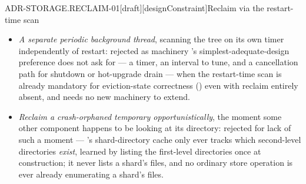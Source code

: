 \begin{requirement}{ADR-STORAGE.RECLAIM-01}[draft][designConstraint]{Reclaim via the restart-time scan}
\begin{itemize}
{      \texttt{purge}}: when a variant is stored, append its hash to a small
      list kept beside its primary, so that purging the primary can unlink
      the listed variants at once. Rejected: a new on-disk structure per
      varied primary, which must stay consistent while variants of one
      primary are stored and replaced concurrently, across processes, and
      through crashes --- and the restart-time scan must exist anyway, for
      crash-orphaned temporaries and for eviction reconstruction. The
      space a variant whose primary is gone holds is already counted against
      the size budget, so leaving it to eviction costs no correctness.
    \item \emph{A separate periodic background thread}, scanning the tree
      on its own timer independently of restart: rejected as machinery
      's simplest-adequate-design preference does
      not ask for --- a timer, an interval to tune, and a cancellation path
      for shutdown or hot-upgrade drain --- when the restart-time scan is
      already mandatory for eviction-state correctness
      () even with reclaim entirely absent,
      and needs no new machinery to extend.
    \item \emph{Reclaim a crash-orphaned temporary opportunistically}, the
      moment some other component happens to be looking at its directory:
      rejected for lack of such a moment --- 's
      shard-directory cache only ever tracks which second-level directories
      \emph{exist}, learned by listing the first-level directories once at
      construction; it never lists a shard's files, and no ordinary store
      operation is ever already enumerating a shard's files.
  \end{itemize}


\end{requirement}

